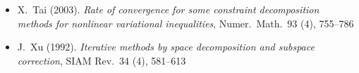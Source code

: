 \begin{itemize}
\item X.~Tai (2003). \emph{Rate of convergence for some constraint decomposition methods for nonlinear variational inequalities}, Numer.~Math.~93 (4), 755--786 
\item J.~Xu (1992). \emph{Iterative methods by space decomposition and subspace correction}, SIAM Rev.~34 (4), 581--613 
\end{itemize}

